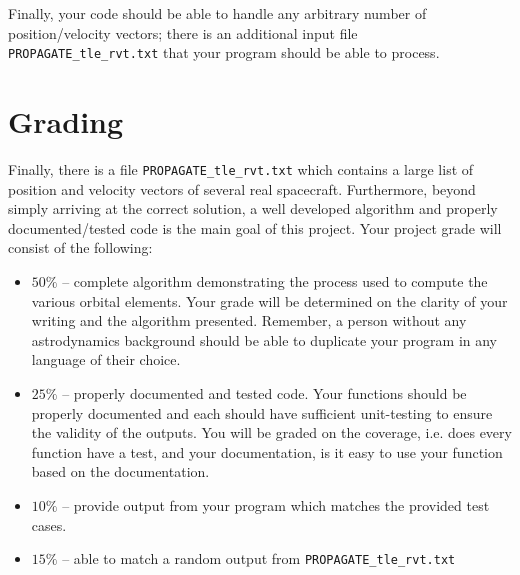 \documentclass[11pt, reqno]{article}    %
\begin{document}
Finally, your code should be able to handle any arbitrary number of position/velocity vectors; there is an additional input file \texttt{PROPAGATE\_tle\_rvt.txt} that your program should be able to process.

\section*{Grading}
Finally, there is a file \texttt{PROPAGATE\_tle\_rvt.txt} which contains a large list of position and velocity vectors of several real spacecraft. 
Furthermore, beyond simply arriving at the correct solution, a well developed algorithm and properly documented/tested code is the main goal of this project.
Your project grade will consist of the following:
\begin{itemize}
    \item \( 50 \% \) -- complete algorithm demonstrating the process used to compute the various orbital elements. 
        Your grade will be determined on the clarity of your writing and the algorithm presented. 
        Remember, a person without any astrodynamics background should be able to duplicate your program in any language of their choice.
    \item \( 25 \% \) -- properly documented and tested code. 
        Your functions should be properly documented and each should have sufficient unit-testing to ensure the validity of the outputs. 
        You will be graded on the coverage, i.e. does every function have a test, and your documentation, is it easy to use your function based on the documentation.
    \item \( 10 \% \) -- provide output from your program which matches the provided test cases.
    \item \( 15 \% \) -- able to match a random output from \texttt{PROPAGATE\_tle\_rvt.txt}
\end{itemize}
\end{document}
